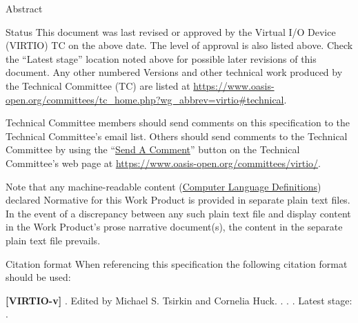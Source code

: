 \begin{titlepage}
\vfill\newpage

\begin{oasistitlesection}{Abstract}

\end{oasistitlesection}

\begin{oasistitlesection}{Status}
This document was last revised or approved by the Virtual I/O Device
(VIRTIO) TC on the above date. The level of approval is also listed above. Check the ``Latest stage'' location noted above for possible later revisions of this document.
Any other numbered Versions and other
technical work produced by the Technical Committee (TC) are
listed at
\url{https://www.oasis-open.org/committees/tc_home.php?wg_abbrev=virtio#technical}.

Technical Committee members should send comments on this
specification to the Technical Committee’s email list. Others
should send comments to the Technical Committee by using the
``\href{https://www.oasis-open.org/committees/comments/form.php?wg_abbrev=virtio}{Send
A Comment}'' button on the Technical Committee’s web page at
\url{https://www.oasis-open.org/committees/virtio/}.



Note that any machine-readable content
(\href{https://www.oasis-open.org/policies-guidelines/tc-process#wpComponentsCompLang}
{Computer Language Definitions}) declared Normative for this Work
Product is provided in separate plain text files. In the event of
a discrepancy between any such plain text file and display
content in the Work Product's prose narrative document(s), the
content in the separate plain text file prevails.

\end{oasistitlesection}


\begin{oasistitlesection}{Citation format}
When referencing this specification the following citation format should be used:\newline

\textbf{[VIRTIO-v\virtiorev]}\newline
\textit{\virtioversion}. Edited by Michael S. Tsirkin and Cornelia Huck. \virtioworkingdraftdate.
\virtiodraftoasisstagename \virtiodraftstageextra . \virtiourlhtml .
Latest stage: \virtiourllatesthtml .
\end{oasistitlesection}


\end{titlepage}
